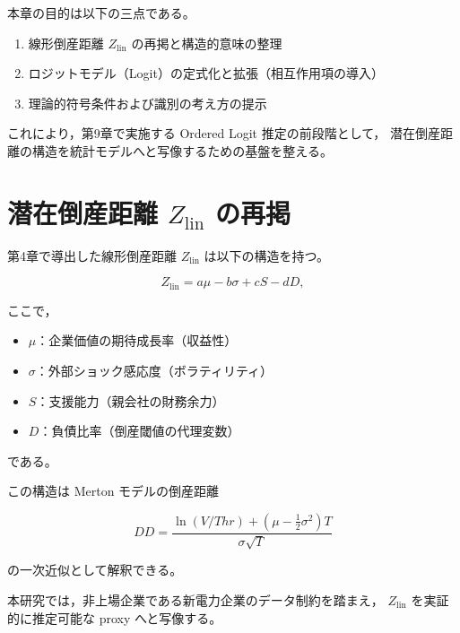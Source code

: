 本章の目的は以下の三点である。

\begin{enumerate}
    \item 線形倒産距離 $Z_{\text{lin}}$ の再掲と構造的意味の整理
    \item ロジットモデル（Logit）の定式化と拡張（相互作用項の導入）
    \item 理論的符号条件および識別の考え方の提示
\end{enumerate}

これにより，第9章で実施する Ordered Logit 推定の前段階として，
潜在倒産距離の構造を統計モデルへと写像するための基盤を整える。


\section{潜在倒産距離 $Z_{\text{lin}}$ の再掲}

第4章で導出した線形倒産距離 $Z_{\text{lin}}$ は以下の構造を持つ。



\[
Z_{\text{lin}}
= a\mu - b\sigma + cS - dD,
\]



ここで，

\begin{itemize}
    \item $\mu$：企業価値の期待成長率（収益性）
    \item $\sigma$：外部ショック感応度（ボラティリティ）
    \item $S$：支援能力（親会社の財務余力）
    \item $D$：負債比率（倒産閾値の代理変数）
\end{itemize}

である。

この構造は Merton モデルの倒産距離



\[
DD = \frac{\ln(V/Thr) + (\mu - \tfrac{1}{2}\sigma^2)T}{\sigma\sqrt{T}}
\]



の一次近似として解釈できる。

本研究では，非上場企業である新電力企業のデータ制約を踏まえ，
$Z_{\text{lin}}$ を実証的に推定可能な proxy へと写像する。


